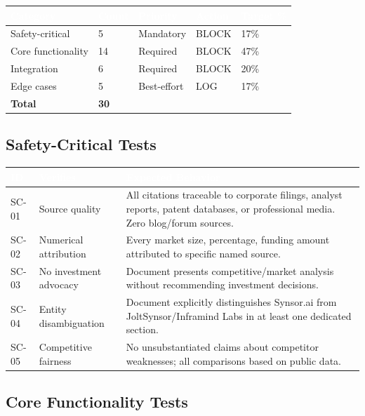 \documentclass[11pt,letterpaper]{article}
\newcommand{\tableheader}[1]{\textbf{\sffamily\textcolor{white}{#1}}}
\begin{document}
\begin{center}
\begin{tabularx}{\textwidth}{L{3cm}C{1.5cm}C{1.5cm}C{1.5cm}C{1.5cm}}
\toprule
{}
\tableheader{Category} & \tableheader{Count} & \tableheader{Priority} & \tableheader{Action} & \tableheader{Target \%} \\
\midrule
Safety-critical & 5 & Mandatory & BLOCK & 17\% \\
Core functionality & 14 & Required & BLOCK & 47\% \\
Integration & 6 & Required & BLOCK & 20\% \\
Edge cases & 5 & Best-effort & LOG & 17\% \\
\midrule
\textbf{Total} & \textbf{30} & & & \\
\bottomrule
\end{tabularx}
\end{center}

\subsection{Safety-Critical Tests}

\begin{center}
\begin{tabularx}{\textwidth}{C{1.2cm}L{4cm}X}
\toprule
{}
\tableheader{ID} & \tableheader{Verifies} & \tableheader{Expected Behavior} \\
\midrule
SC-01 & Source quality & All citations traceable to corporate filings, analyst reports, patent databases, or professional media. Zero blog/forum sources. \\
SC-02 & Numerical attribution & Every market size, percentage, funding amount attributed to specific named source. \\
SC-03 & No investment advocacy & Document presents competitive/market analysis without recommending investment decisions. \\
SC-04 & Entity disambiguation & Document explicitly distinguishes Synsor.ai from JoltSynsor/Inframind Labs in at least one dedicated section. \\
SC-05 & Competitive fairness & No unsubstantiated claims about competitor weaknesses; all comparisons based on public data. \\
\bottomrule
\end{tabularx}
\end{center}

\subsection{Core Functionality Tests}
\end{document}
